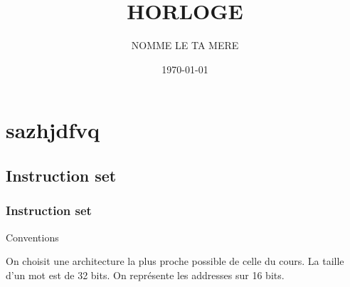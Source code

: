 \documentclass[12pt]{beamer}
\title{HORLOGE}
\author{NOMME LE TA MERE}
\institute{ENS}
\date{\today}
\begin{document}

\frame{\titlepage} %

\begin{frame}
\tableofcontents %
\end{frame}


\section{sazhjdfvq}
\subsection{Instruction set}

\begin{frame}
\frametitle{Instruction set}

\begin{prop}{Conventions}{}

    On choisit une architecture la plus proche possible de celle du cours. La taille d'un mot est de 32 bits.
    On représente les addresses sur 16 bits.\\
    
\end{prop}
\end{frame}
\end{document}
